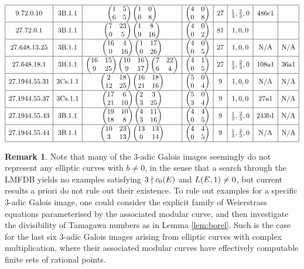 \documentclass{article}
\theoremstyle{plain}
\theoremstyle{definition}
\newtheorem{remark}[n]{Remark}
\newcommand{\br}{\!\del}
\newcommand{\twobytwo}[4]{\begin{pmatrix} #1 & #2 \\ #3 & #4 \end{pmatrix}}
\begin{document}
$$\begin{array}{|c|c|c|c|c|c|c|c|}
\hline
9.72.0.10 & \text{3B.1.1} & \twobytwo{1}{5}{6}{5} \twobytwo{1}{0}{0}{8} & \twobytwo{4}{0}{0}{8} & 27 & \tfrac{1}{3}, \tfrac{2}{3}, 0 & \text{486c1} & \text{} \\
\hline
27.72.0.1 & \text{3B.1.1} & \twobytwo{7}{23}{0}{5} \twobytwo{1}{8}{9}{16} & \twobytwo{4}{0}{0}{2} & 81 & 1, 0, 0 & \text{} & \text{} \\
\hline
27.648.13.25 & \text{3B.1.1} & \twobytwo{16}{4}{0}{16} \twobytwo{1}{17}{0}{26} & \twobytwo{4}{0}{0}{5} & 27 & 1, 0, 0 & \text{N/A} & \text{N/A} \\
\hline
27.648.18.1 & \text{3B.1.1} & \twobytwo{16}{15}{9}{25} \twobytwo{10}{16}{9}{17} \twobytwo{7}{22}{6}{4} & \twobytwo{4}{1}{0}{5} & 27 & \tfrac{1}{3}, \tfrac{2}{3}, 0 & \text{108a1} & \text{36a1} \\
\hline
27.1944.55.31 & \text{3Cs.1.1} & \twobytwo{2}{18}{12}{25} \twobytwo{16}{18}{21}{16} & \twobytwo{5}{0}{0}{4} & 9 & 1, 0, 0 & \text{N/A} & \text{N/A} \\
\hline
27.1944.55.37 & \text{3Cs.1.1} & \twobytwo{17}{6}{21}{10} \twobytwo{2}{3}{3}{25} & \twobytwo{5}{0}{3}{4} & 9 & 1, 0, 0 & \text{27a1} & \text{N/A} \\
\hline
27.1944.55.43 & \text{3B.1.1} & \twobytwo{19}{10}{18}{8} \twobytwo{4}{11}{3}{16} & \twobytwo{4}{4}{0}{5} & 9 & \tfrac{1}{3}, \tfrac{2}{3}, 0 & \text{243b1} & \text{N/A} \\
\hline
27.1944.55.44 & \text{3B.1.1} & \twobytwo{10}{23}{3}{13} \twobytwo{13}{13}{0}{14} & \twobytwo{4}{4}{0}{5} & 9 & \tfrac{1}{3}, \tfrac{2}{3}, 0 & \text{N/A} & \text{N/A} \\
\hline
\end{array}
$$

\vspace{0.5cm}

\begin{remark}
Note that many of the $ 3 $-adic Galois images seemingly do not represent any elliptic curves with $ b \ne 0 $, in the sense that a search through the LMFDB \cite{Col} yields no examples satisfying $ 3 \nmid c_0\br{E} $ and $ L\br{E, 1} \ne 0 $, but current results a priori do not rule out their existence. To rule out examples for a specific $ 3 $-adic Galois image, one could consider the explicit family of Weierstrass equations parameterised by the associated modular curve, and then investigate the divisibility of Tamagawa numbers as in Lemma \ref{lem:borel}. Such is the case for the last six $ 3 $-adic Galois images arising from elliptic curves with complex multiplication, where their associated modular curves have effectively computable finite sets of rational points.
\end{remark}

\pagebreak


\end{document}
